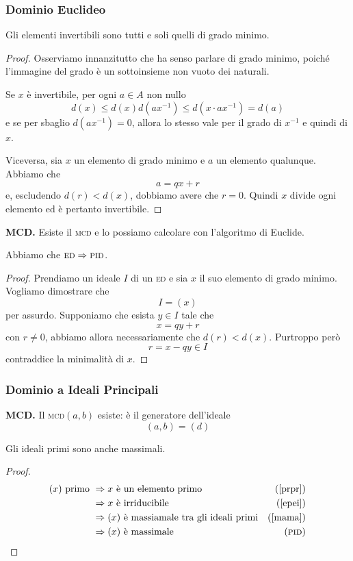 \begin{multicols}{2}
\subsubsection{Dominio Euclideo}

\begin{prop}
	Gli elementi invertibili sono tutti e soli quelli di grado minimo.
\end{prop}
\begin{proof}
	Osserviamo innanzitutto che ha senso parlare di grado minimo, poiché l'immagine del grado è un sottoinsieme non vuoto dei naturali.
	
	Se $ x $ è invertibile, per ogni $ a \in A $ non nullo
	\[ d(x) \leq d(x) d(ax^{-1}) \leq d(x \cdot ax^{-1}) = d(a) \]
	e se per sbaglio $ d(ax^{-1}) = 0 $, allora lo stesso vale per il grado di $ x^{-1} $ e quindi di $ x $.
	
	Viceversa, sia $ x $ un elemento di grado minimo e $ a $ un elemento qualunque. Abbiamo che
	\[ a = qx + r \]
	e, escludendo $ d(r) < d(x) $, dobbiamo avere che $ r = 0 $. Quindi $ x $ divide ogni elemento ed è pertanto invertibile. 
\end{proof}


\textbf{MCD.} Esiste il \textsc{mcd} e lo possiamo calcolare con l'algoritmo di Euclide.

	
\begin{prop}\label{abc}
	 Abbiamo che $ \textsc{ed}\Rightarrow\textsc{pid}$.
\end{prop}
\begin{proof}
	Prendiamo un ideale $ I $ di un \textsc{ed} e sia $ x $ il suo elemento di grado minimo. Vogliamo dimostrare che 
	\[ I = (x) \]
	per assurdo. Supponiamo che esista $ y \in I $ tale che
	\[ x = qy + r \]
	con $ r \neq 0 $, abbiamo allora necessariamente che $ d(r) < d(x) $. Purtroppo però
	\[ r = x - qy \in I \]
	contraddice la minimalità di $ x $.
\end{proof}

\subsubsection{Dominio a Ideali Principali}

\textbf{MCD.} Il \textsc{mcd}$ (a, b) $ esiste: è il generatore dell'ideale $$  (a, b) = (d)  $$


\begin{theorem}\label{primossemassimale}
	Gli ideali primi sono anche massimali.
\end{theorem}
\begin{proof}
	\begin{align*}
		(x) \text{ primo } & \Rightarrow x \text{ è un elemento primo} & \text{(\ref{prpr})} \\
		& \Rightarrow x \text{ è irriducibile} &\text{(\ref{epei})} \\
		& \Rightarrow (x) \text{ è massiamale tra gli ideali primi} &\text{(\ref{mama})} \\
		& \Rightarrow (x) \text{ è massimale} &\text{(\textsc{pid})}
	\end{align*}
\end{proof}


\end{multicols}
